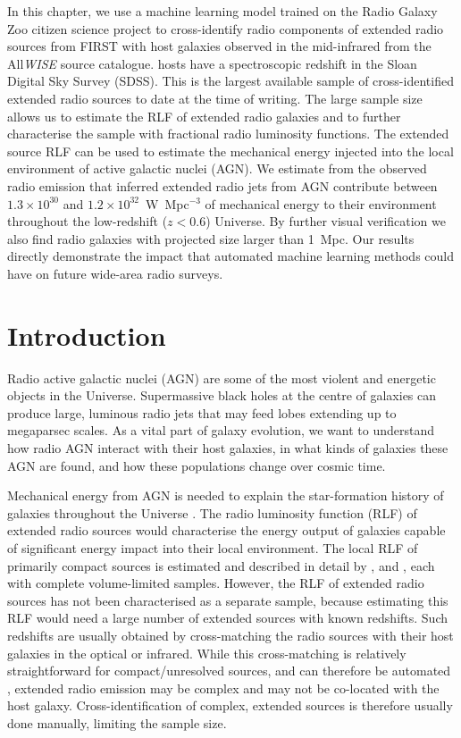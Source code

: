 In this chapter, we use a machine learning model trained on the Radio Galaxy Zoo citizen science project to cross-identify \ncomponents{} radio components of extended radio sources from FIRST with \nsources{} host galaxies observed in the mid-infrared from the All\emph{WISE} source catalogue. \nsourceszsp{} hosts have a spectroscopic redshift in the Sloan Digital Sky Survey (SDSS). This is the largest available sample of cross-identified extended radio sources to date at the time of writing. The large sample size allows us to estimate the RLF of extended radio galaxies and to further characterise the sample with fractional radio luminosity functions. The extended source RLF can be used to estimate the mechanical energy injected into the local environment of active galactic nuclei (AGN). We estimate from the observed radio emission that inferred extended radio jets from AGN contribute between $1.3 \times 10^{30}$ and $1.2 \times 10^{32}$~W~Mpc$^{-3}$ of mechanical energy to their environment throughout the low-redshift ($z < 0.6$) Universe. By further visual verification we also find \nnewgiants{} radio galaxies with projected size larger than 1~Mpc. Our results directly demonstrate the impact that automated machine learning methods could have on future wide-area radio surveys.

\section{Introduction} \label{sec:rlfs-intro}

Radio active galactic nuclei (AGN) are some of the most violent and energetic
objects in the Universe. Supermassive black holes at the centre of galaxies
can produce large, luminous radio jets that may feed lobes extending up to
megaparsec scales. As a vital part of galaxy evolution, we want to understand
how radio AGN interact with their host galaxies, in what kinds of galaxies
these AGN are found, and how these populations change over cosmic time.

Mechanical energy from AGN is needed to explain the star-formation history of galaxies throughout the Universe \citep[e.g.][]{raouf17agn,hardcastle20feedback}. The radio luminosity function (RLF) of extended radio sources would characterise the energy output of galaxies capable of significant energy impact into their local environment. The local RLF of primarily compact sources is estimated and
described in detail by \citet{mauch07rlf}, \citet{pracy16rlf} and
\citet{condon19rlf}, each with complete volume-limited samples. However, the RLF of extended radio sources has not been
characterised as a separate sample, because estimating this RLF would need a large number of extended sources with known
redshifts. Such redshifts are usually obtained by cross-matching the radio
sources with their host galaxies in the optical or infrared. While this
cross-matching is relatively straightforward for compact/unresolved sources,
and can therefore be automated \citep[e.g.][]{kimball08}, extended radio
emission may be complex and may not be co-located with the host galaxy.
Cross-identification of complex, extended sources is therefore usually done
manually, limiting the sample size.

